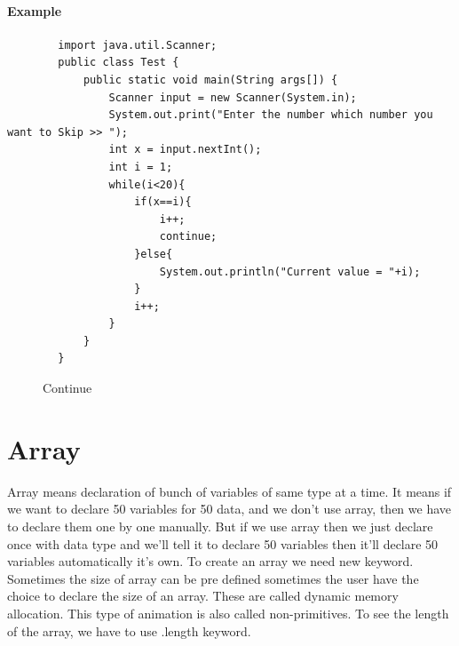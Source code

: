\documentclass[openany]{book}  %
\begin{document}
\subsubsection{Example}
\begin{center}
    \begin{verbatim}
        import java.util.Scanner;
        public class Test {
            public static void main(String args[]) {
                Scanner input = new Scanner(System.in);
                System.out.print("Enter the number which number you want to Skip >> ");
                int x = input.nextInt();
                int i = 1;
                while(i<20){
                    if(x==i){
                        i++;
                        continue;
                    }else{
                        System.out.println("Current value = "+i);
                    }
                    i++;
                }
            }
        }
    \end{verbatim}
\end{center}
% 
% 
\begin{figure}[htbp]
    \begin{center}
        \caption{Continue}
    \end{center}
\end{figure}


% 
% 
\chapter{Array}
Array means declaration of bunch of variables of same type at a time.
It means if we want to declare 50 variables for 50 data, and we don't
use array, then we have to declare them one by one manually. But if we 
use array then we just declare once with data type and we'll tell
it to declare 50 variables then it'll declare 50 variables automatically
it's own. \linebreak
To create an array we need new keyword. Sometimes the size of array 
can be pre defined sometimes the user have the choice to declare the
size of an array. These are called dynamic memory allocation. This
type of animation is also called non-primitives. \linebreak
To see the length of the array, we have to use .length keyword.
% 
%  
\end{document}
